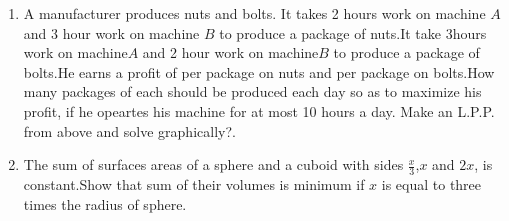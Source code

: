 \begin{enumerate}
\item A manufacturer produces nuts and bolts. It takes 2 hours work on machine $A$ and 3 hour work on machine $B$ to produce a package of nuts.It take 3hours work on machine$A$ and 2 hour work on machine$B$ to produce a package of bolts.He earns a profit of  per package on nuts and  per package on bolts.How many packages of each should be produced each day so as to maximize his profit, if he opeartes his machine for at most 10 hours a day. Make an L.P.P. from above and solve graphically?.\\

\item The sum of surfaces areas of a sphere and a cuboid with sides $\frac{x}{3}$,$x$ and $2x$, is constant.Show that sum of their volumes is minimum if $x$ is equal to three times the radius of sphere.
\end{enumerate}
